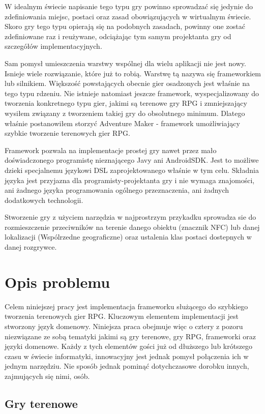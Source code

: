 \documentclass	{xmgr}
\begin{document}
W idealnym świecie napisanie tego typu gry powinno sprowadzać się jedynie do zdefiniowania miejsc, postaci oraz zasad obowiązujących w wirtualnym świecie.
Skoro gry tego typu opierają się na podobnych zasadach, powinny one zostać zdefiniowane raz i reużywane, odciążając tym samym projektanta gry od szczegółów implementacyjnych. 

Sam pomysł umieszczenia warstwy wspólnej dla wielu aplikacji nie jest nowy. Isnieje wiele rozwiązanie, które już to robią. Warstwę tą nazywa się frameworkiem lub silnikiem. Większość powstających obecnie gier osadzonych jest właśnie na tego typu rdzeniu. 
Nie istnieje natomiast jeszcze framework, wyspecjalizowany do tworzenia konkretnego typu gier, jakimi są terenowe gry RPG i zmniejszający wysiłem związany z tworzeniem takiej gry do obsolutnego minimum. Dlatego właśnie postanowiłem storzyć Adventure Maker - framework umożliwiający szybkie tworzenie terenowych gier RPG. 

Framework pozwala na implementacje prostej gry nawet przez mało doświadczonego programistę nieznającego Javy ani AndroidSDK. Jest to możliwe dzieki specjalnemu językowi DSL zaprojektowanego właśnie w tym celu. Składnia języka jest przyjazna dla programisty-projektanta gry i nie wymaga znajomości, ani żadnego języka programowania ogólnego przeznaczenia, ani żadnych dodatkowych technologii.

Stworzenie gry z użyciem narzędzia w najprostrzym przykadku sprowadza sie do rozmieszczenie przeciwników na terenie danego obiektu (znacznik NFC) lub danej lokalizacji (Wspólrzedne geograficzne) oraz ustalenia klas postaci dostepnych w danej rozgrywce.

\chapter{Opis problemu}

Celem niniejszej pracy jest implementacja frameworku służącego do szybkiego tworzenia terenowych gier RPG. Kluczowym elementem implementacji jest stworzony język domenowy. Niniejsza praca obejmuje więc o cztery z pozoru niezwiązane ze sobą tematyki jakimi są gry terenowe, gry RPG, frameworki oraz języki domenowe. Każdy z tych elementów gości już od dłuższego lub krótszego czasu w świecie informatyki, innowacyjny jest jednak pomysł połączenia ich w jednym narzędziu. Nie sposób jednak pominąć dotychczasowe dorobku innych, zajmujących się nimi, osób. 

\section{Gry terenowe}
\end{document}
